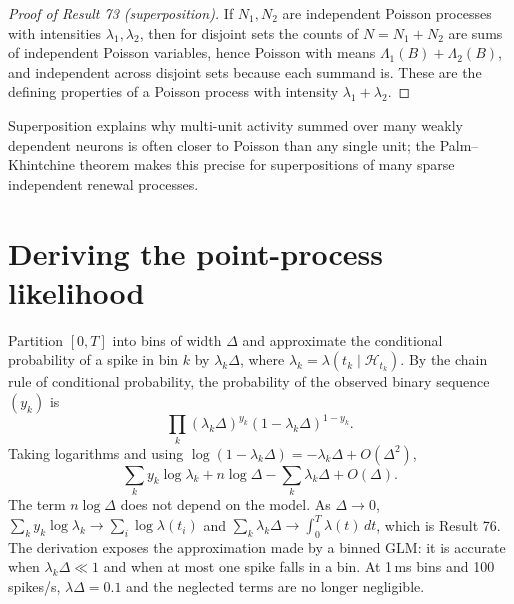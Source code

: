 \begin{proof}[Proof of Result 73 (superposition)]
If $N_1,N_2$ are independent Poisson processes with intensities
$\lambda_1,\lambda_2$, then for disjoint sets the counts of
$N=N_1+N_2$ are sums of independent Poisson variables, hence Poisson
with means $\Lambda_1(B)+\Lambda_2(B)$, and independent across disjoint
sets because each summand is. These are the defining properties of a
Poisson process with intensity $\lambda_1+\lambda_2$.
\end{proof}
Superposition explains why multi-unit activity summed over many weakly
dependent neurons is often closer to Poisson than any single unit; the
Palm--Khintchine theorem makes this precise for superpositions of many
sparse independent renewal processes.

\section{Deriving the point-process likelihood}
Partition $[0,T]$ into bins of width $\Delta$ and approximate the
conditional probability of a spike in bin $k$ by
$\lambda_k\Delta$, where $\lambda_k=\lambda(t_k\mid\mathcal H_{t_k})$.
By the chain rule of conditional probability, the probability of the
observed binary sequence $(y_k)$ is
\[
\prod_k(\lambda_k\Delta)^{y_k}(1-\lambda_k\Delta)^{1-y_k}.
\]
Taking logarithms and using $\log(1-\lambda_k\Delta)=-\lambda_k\Delta+O(\Delta^2)$,
\[
\sum_ky_k\log\lambda_k+n\log\Delta-\sum_k\lambda_k\Delta+O(\Delta).
\]
The term $n\log\Delta$ does not depend on the model. As $\Delta\to0$,
$\sum_ky_k\log\lambda_k\to\sum_i\log\lambda(t_i)$ and
$\sum_k\lambda_k\Delta\to\int_0^T\lambda(t)\,dt$, which is Result 76.
The derivation exposes the approximation made by a binned GLM: it is
accurate when $\lambda_k\Delta\ll1$ and when at most one spike falls in
a bin. At 1\,ms bins and 100\,spikes/s, $\lambda\Delta=0.1$ and the
neglected terms are no longer negligible.


